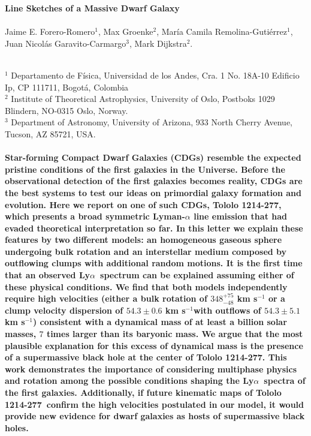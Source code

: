 \documentclass[a4paper, usenatbib, 12pt]{article}
\newcommand{\tol}{Tololo 1214-277}
\newcommand{\lya}{Ly$\alpha$}
\newcommand{\sigmaclump}{$54.3\pm 0.6$ km s$^{-1}$}
\newcommand{\inftyclump}{$54.3\pm 5.1$ km s$^{-1}$}
\begin{document}
\pagestyle{empty}
\noindent
\textbf{Line Sketches of a Massive Dwarf Galaxy}
\\
\\
Jaime E. Forero-Romero$^{1}$, Max Groenke$^2$, Mar\'ia Camila
Remolina-Guti\'errez$^1$, Juan Nicol\'as
Garavito-Carmargo$^3$, Mark Dijkstra$^2$.
\\
\\
\scriptsize
{$^1$ Departamento de Física, Universidad de los Andes, Cra. 1
  No. 18A-10 Edificio Ip, CP 111711, Bogot\'a, Colombia 
\\
$^2$ Institute of Theoretical Astrophysics, University of Oslo,
Postboks 1029 Blindern, NO-0315 Oslo, Norway.
\\
$^3$ Department of Astronomy, University of Arizona, 933 North Cherry
Avenue, Tucson, AZ 85721, USA. 
\normalsize
\\
\\
\textbf{
  Star-forming Compact Dwarf Galaxies (CDGs) resemble the expected
  pristine conditions of the first galaxies in the Universe.    
Before the observational detection of the first galaxies becomes
reality, CDGs are the best systems to test our ideas on primordial
galaxy formation and evolution.    
Here we report on one of such CDGs, \tol, which presents
a broad symmetric Lyman-$\alpha$ line emission that had evaded theoretical
interpretation so far. 
In this letter we explain these features by two different models: an
homogeneous gaseous sphere undergoing bulk rotation and an interstellar
medium composed by outflowing clumps with additional random motions.
It is the first time that an observed \lya\ spectrum can be explained
assuming either of these physical conditions.
We find that both models independently require high velocities
(either a bulk rotation of $348^{+75}_{-48}$ km s$^{-1}$ or a clump velocity
dispersion of \sigmaclump with outflows of
\inftyclump) consistent with a dynamical mass of at
least a billion solar masses, $7$ times larger than its baryonic mass.   
We argue that the most plausible explanation for this excess of
dynamical mass is the presence of a supermassive black hole at the
center of \tol. 
This work demonstrates the importance of considering multiphase
physics and rotation among the possible conditions shaping the
\lya\ spectra of the first galaxies.  
Additionally, if future kinematic maps of \tol\ confirm the high
velocities postulated in our model, it would provide new
evidence for dwarf galaxies as hosts of supermassive black
holes.  
}  



}
\end{document}
